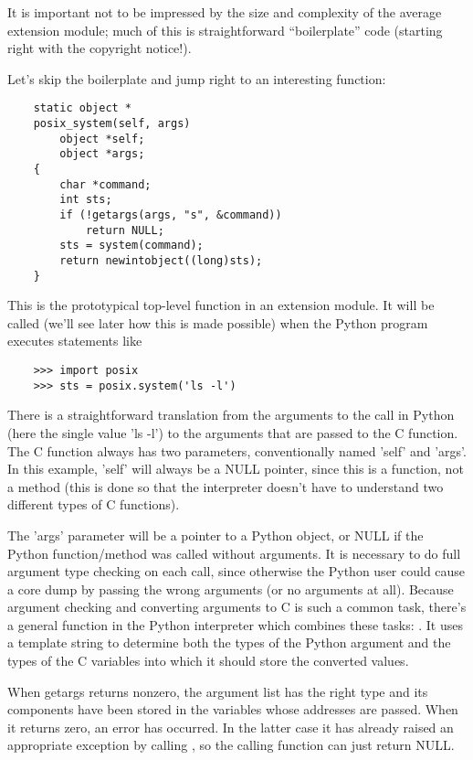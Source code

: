 It is important not to be impressed by the size and complexity of
the average extension module; much of this is straightforward
``boilerplate'' code (starting right with the copyright notice!).

Let's skip the boilerplate and jump right to an interesting function:

\begin{verbatim}
    static object *
    posix_system(self, args)
        object *self;
        object *args;
    {
        char *command;
        int sts;
        if (!getargs(args, "s", &command))
            return NULL;
        sts = system(command);
        return newintobject((long)sts);
    }
\end{verbatim}

This is the prototypical top-level function in an extension module.
It will be called (we'll see later how this is made possible) when the
Python program executes statements like

\begin{verbatim}
    >>> import posix
    >>> sts = posix.system('ls -l')
\end{verbatim}

There is a straightforward translation from the arguments to the call
in Python (here the single value 'ls -l') to the arguments that are
passed to the C function.  The C function always has two parameters,
conventionally named 'self' and 'args'.  In this example, 'self' will
always be a NULL pointer, since this is a function, not a method (this
is done so that the interpreter doesn't have to understand two
different types of C functions).

The 'args' parameter will be a pointer to a Python object, or NULL if
the Python function/method was called without arguments.  It is
necessary to do full argument type checking on each call, since
otherwise the Python user could cause a core dump by passing the wrong
arguments (or no arguments at all).  Because argument checking and
converting arguments to C is such a common task, there's a general
function in the Python interpreter which combines these tasks:
.  It uses a template string to determine both the
types of the Python argument and the types of the C variables into
which it should store the converted values.

When getargs returns nonzero, the argument list has the right type and
its components have been stored in the variables whose addresses are
passed.  When it returns zero, an error has occurred.  In the latter
case it has already raised an appropriate exception by calling
, so the calling function can just return NULL.

